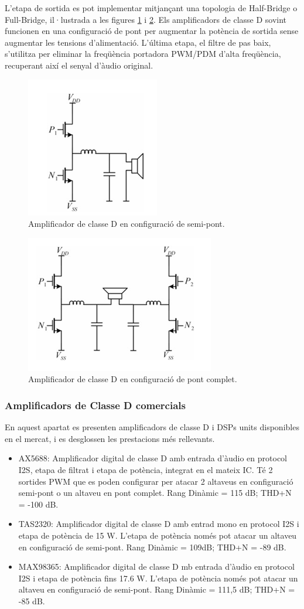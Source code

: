 \par L'etapa de sortida es pot implementar mitjançant una topologia de Half-Bridge o Full-Bridge, il·lustrada a les figures \ref{fighalfbridge} i \ref{figFullbridge}. Els amplificadors de classe D sovint funcionen en una configuració de pont per augmentar la potència de sortida sense augmentar les tensions d'alimentació. L'última etapa, el filtre de pas baix, s'utilitza per eliminar la freqüència portadora PWM/PDM d'alta freqüència, recuperant així el senyal d'àudio original\cite{SDMClassD}.
\begin{figure}[H]
    \centering
    \includegraphics[width=0.25\linewidth]{Images/halfbridge.png}
    \caption{Amplificador de classe D en configuració de semi-pont.}
    \label{fighalfbridge}
\end{figure}
\begin{figure}[H]
    \centering
    \includegraphics[width=0.3\linewidth]{Images/full-bridge.png}
    \caption{Amplificador de classe D en configuració de pont complet.}
    \label{figFullbridge}
\end{figure}

\subsubsection{Amplificadors de Classe D comercials}
\par En aquest apartat es presenten amplificadors de classe D i DSPs units disponibles en el mercat, i es desglossen les prestacions més rellevants.
\begin{itemize}
    \item AX5688: Amplificador digital de classe D amb entrada d'àudio en protocol I2S, etapa de filtrat i etapa de potència, integrat en el mateix IC. Té 2 sortides PWM que es poden configurar per atacar 2 altaveus en configuració semi-pont o un altaveu en pont complet. Rang Dinàmic = 115 dB; THD+N = -100 dB. \cite{MPSAmpD}
    \item TAS2320: Amplificador digital de classe D amb entrad mono en protocol I2S i etapa de potència de 15 W. L'etapa de potència només pot atacar un altaveu en configuració de semi-pont. Rang Dinàmic = 109dB; THD+N = -89 dB. \cite{TIAmpD}
    \item MAX98365: Amplificador digital de classe D mb entrada d'àudio en protocol I2S i etapa de potència fins 17.6 W. L'etapa de potència només pot atacar un altaveu en configuració de semi-pont. Rang Dinàmic = 111,5 dB; THD+N = -85 dB.\cite{AnalogAmpD}
\end{itemize}

